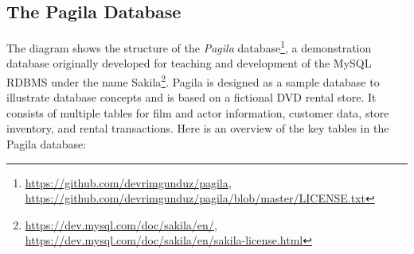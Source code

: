 \subsection*{The Pagila Database}

The diagram shows the structure of the \emph{Pagila} database\footnote{\url{https://github.com/devrimgunduz/pagila}, \\
\url{https://github.com/devrimgunduz/pagila/blob/master/LICENSE.txt}}, a demonstration database originally developed for teaching and development of the MySQL RDBMS under the name Sakila\footnote{\url{https://dev.mysql.com/doc/sakila/en/}, \\
\url{https://dev.mysql.com/doc/sakila/en/sakila-license.html}}. Pagila is designed as a sample database to illustrate database concepts and is based on a fictional DVD rental store. It consists of multiple tables for film and actor information, customer data, store inventory, and rental transactions. Here is an overview of the key tables in the Pagila database:

